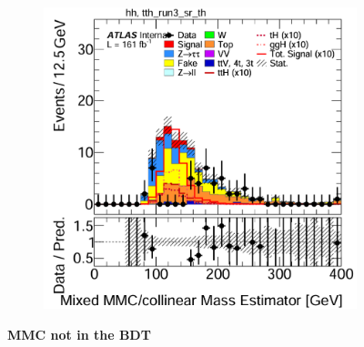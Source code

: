 \begin{figure}[htbp]
\begin{subfigure}[t]{0.45\textwidth}
    \includegraphics[width=\linewidth]{images/mmc_th_tth/run_3_wo_mmc_th.png}
  \end{subfigure}

  \vspace{0.2cm}
  \begin{minipage}{\textwidth}
    \centering
    \small {\textbf{MMC not in the BDT}}
  \end{minipage}

  \vspace{0.5cm}


\end{figure}
